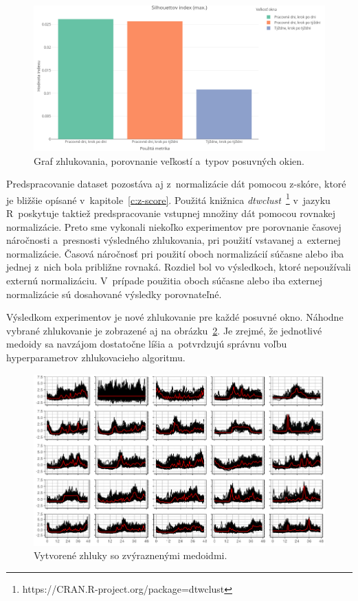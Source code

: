 \documentclass[a4paper,twoside,slovak,12pt,appendix]{article}
\begin{document}
\begin{figure}[htbp]
  \centering
  \includegraphics[width=\textwidth]{cvi/window_comparison/201903072017-Sil-window_comparison.png}
  \caption{Graf zhlukovania, porovnanie veľkostí a~typov posuvných okien.}
	\label{fig:cvi-window-sil}
\end{figure}

Predspracovanie dataset pozostáva aj z~normalizácie dát pomocou z-skóre, ktoré
je bližšie opísané v~kapitole~\ref{c:z-score}. Použitá knižnica
\textit{dtwclust}~\footnote{https://CRAN.R-project.org/package=dtwclust}
v~jazyku R~poskytuje taktiež predspracovanie vstupnej množiny dát pomocou
rovnakej normalizácie. Preto sme vykonali niekoľko experimentov pre porovnanie
časovej náročnosti a~presnosti výsledného zhlukovania, pri použití vstavanej
a~externej normalizácie. Časová náročnosť pri použití oboch normalizácií súčasne
alebo iba jednej z~nich bola približne rovnaká. Rozdiel bol vo výsledkoch, ktoré
nepoužívali externú normalizáciu. V~prípade použitia oboch súčasne alebo iba
externej normalizácie sú dosahované výsledky porovnateľné.

Výsledkom experimentov je nové zhlukovanie pre každé posuvné okno. Náhodne
vybrané zhlukovanie je zobrazené aj na obrázku~\ref{fig:clustering-workdays}.
Je zrejmé, že jednotlivé medoidy sa navzájom dostatočne líšia a~potvrdzujú
správnu voľbu hyperparametrov zhlukovacieho algoritmu.

\begin{figure}[htbp]
  \centering
  \includegraphics[width=\textwidth]{clustering_workdays.png}
  \caption{Vytvorené zhluky so zvýraznenými medoidmi.}
	\label{fig:clustering-workdays}
\end{figure}
\end{document}
